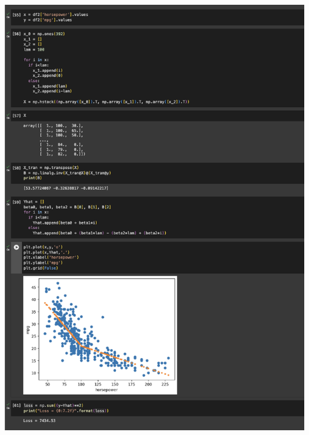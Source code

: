 \documentclass{assignment}
\begin{document}
\includegraphics[trim={0 0 0 16.8cm},clip]{Screenshot 2024-02-15 at 19.28.37.png} \\
\end{document}
